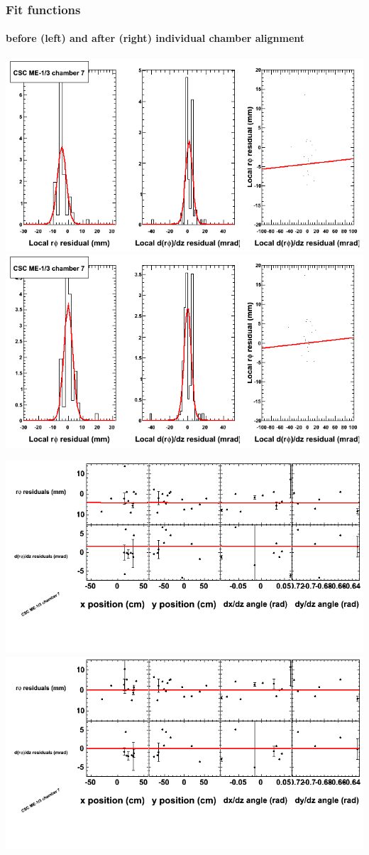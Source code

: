 \documentclass[compress]{beamer}
\begin{document}
\begin{frame}
\frametitle{Fit functions}
\framesubtitle{before (left) and after (right) individual chamber alignment}
\includegraphics[width=0.5\linewidth]{ringfits_3dof/beforefit_MEm13_07_bellcurve.png} \includegraphics[width=0.5\linewidth]{ringfits_3dof/afterfit_MEm13_07_bellcurve.png}

\includegraphics[width=0.5\linewidth]{ringfits_3dof/beforefit_MEm13_07_polynomials.png} \includegraphics[width=0.5\linewidth]{ringfits_3dof/afterfit_MEm13_07_polynomials.png}
\end{frame}
\end{document}
